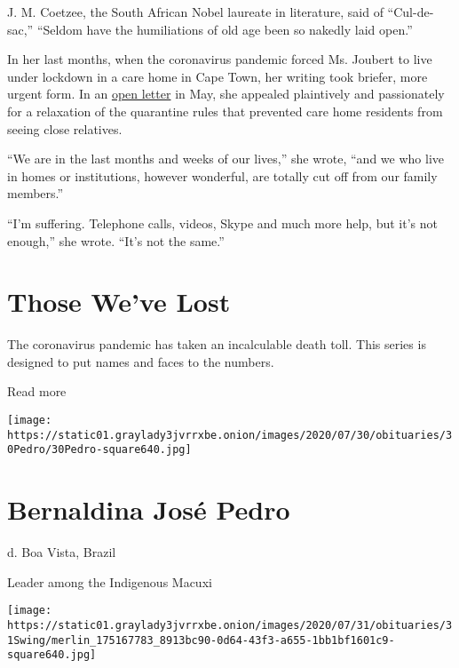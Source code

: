 J. M. Coetzee, the South African Nobel laureate in literature, said of
``Cul-de-sac,'' ``Seldom have the humiliations of old age been so
nakedly laid open.''

In her last months, when the coronavirus pandemic forced Ms. Joubert to
live under lockdown in a care home in Cape Town, her writing took
briefer, more urgent form. In an
\href{https://www.news24.com/arts/literature/iconic-sa-author-elsa-joubert-97-dies-of-covid-19-20200614}{open
letter} in May, she appealed plaintively and passionately for a
relaxation of the quarantine rules that prevented care home residents
from seeing close relatives.

``We are in the last months and weeks of our lives,'' she wrote, ``and
we who live in homes or institutions, however wonderful, are totally cut
off from our family members.''

``I'm suffering. Telephone calls, videos, Skype and much more help, but
it's not enough,'' she wrote. ``It's not the same.''

\href{https://www.nytimes3xbfgragh.onion/interactive/2020/obituaries/people-died-coronavirus-obituaries.html?action=click\&pgtype=Article\&state=default\&region=BELOW_MAIN_CONTENT\&context=covid_obits_promo}{}

\hypertarget{those-weve-lost}{%
\section{Those We've Lost}\label{those-weve-lost}}

The coronavirus pandemic has taken an incalculable death toll. This
series is designed to put names and faces to the numbers.

Read more

\texttt{[image: https://static01.graylady3jvrrxbe.onion/images/2020/07/30/obituaries/30Pedro/30Pedro-square640.jpg]}

\hypertarget{bernaldina-josuxe9-pedro}{%
\section{Bernaldina José Pedro}\label{bernaldina-josuxe9-pedro}}

d. Boa Vista, Brazil

Leader among the Indigenous Macuxi

\texttt{[image: https://static01.graylady3jvrrxbe.onion/images/2020/07/31/obituaries/31Swing/merlin\_175167783\_8913bc90-0d64-43f3-a655-1bb1bf1601c9-square640.jpg]}

